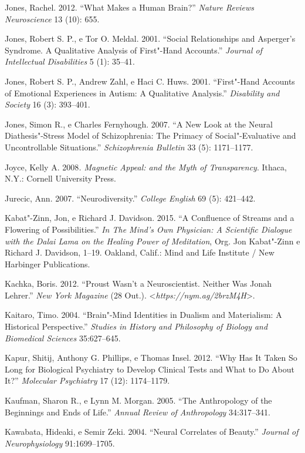 {\begin{Parskip}
Jones, Rachel. 2012. ``What Makes a Human Brain?'' \emph{Nature Reviews
Neuroscience} 13 (10): 655.

Jones, Robert S. P., e Tor O. Meldal. 2001. ``Social Relationships and
Asperger's Syndrome. A Qualitative Analysis of First"-Hand Accounts.''
\emph{Journal of Intellectual Disabilities} 5 (1): 35--41.

Jones, Robert S. P., Andrew Zahl, e Haci C. Huws. 2001. ``First"-Hand
Accounts of Emotional Experiences in Autism: A Qualitative Analysis.''
\emph{Disability and Society} 16 (3): 393--401.

Jones, Simon R., e Charles Fernyhough. 2007. ``A New Look at the Neural
Diathesis"-Stress Model of Schizophrenia: The Primacy of
Social"-Evaluative and Uncontrollable Situations.'' \emph{Schizophrenia
Bulletin} 33 (5): 1171--1177.

Joyce, Kelly A. 2008\emph{. Magnetic Appeal:  and the Myth of
Transparency}. Ithaca, N.Y.: Cornell University Press.

Jurecic, Ann. 2007. ``Neurodiversity.'' \emph{College English} 69 (5):
421--442.

Kabat"-Zinn, Jon, e Richard J. Davidson. 2015. ``A Confluence of Streams
and a Flowering of Possibilities.'' \emph{In The Mind's Own Physician: A
Scientific Dialogue with the Dalai Lama on the Healing Power of
Meditation}, Org. Jon Kabat"-Zinn e Richard J. Davidson, 1--19. Oakland,
Calif.: Mind and Life Institute / New Harbinger Publications.

Kachka, Boris. 2012. ``Proust Wasn't a Neuroscientist. Neither Was Jonah
Lehrer.'' \emph{New York Magazine} (28 Out.).
\textless{}\emph{https://nym.ag/2brzM4H}\textgreater{}.

Kaitaro, Timo. 2004. ``Brain"-Mind Identities in Dualism and Materialism:
A Historical Perspective.'' \emph{Studies in History and Philosophy of
Biology and Biomedical Sciences} 35:627--645.

Kapur, Shitij, Anthony G. Phillips, e Thomas Insel. 2012. ``Why Has It
Taken So Long for Biological Psychiatry to Develop Clinical Tests and
What to Do About It?'' \emph{Molecular Psychiatry} 17 (12): 1174--1179.

Kaufman, Sharon R., e Lynn M. Morgan. 2005. ``The Anthropology of the
Beginnings and Ends of Life.'' \emph{Annual Review of Anthropology}
34:317--341.

Kawabata, Hideaki, e Semir Zeki. 2004. ``Neural Correlates of Beauty.''
\emph{Journal of Neurophysiology} 91:1699--1705.


\end{Parskip}}
